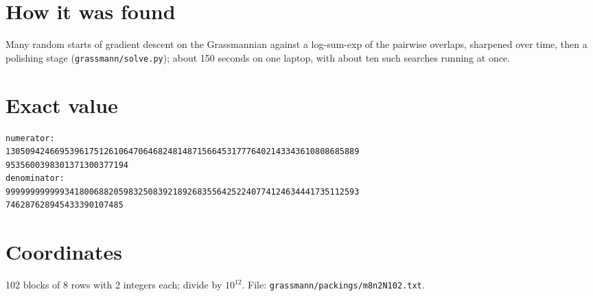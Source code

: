 \documentclass[11pt,a4paper]{article}
\begin{document}
\section{How it was found}
Many random starts of gradient descent on the Grassmannian against a log-sum-exp of the pairwise overlaps, sharpened over time, then a polishing stage (\texttt{grassmann/solve.py}); about 150 seconds on one laptop, with about ten such searches running at once.


\appendix
\section{Exact value}
{\small
\begin{verbatim}
numerator:
130509424669539617512610647064682481487156645317776402143343610808685889
9535600398301371300377194
denominator:
999999999999341800688205983250839218926835564252240774124634441735112593
746287628945433390107485
\end{verbatim}}

\section{Coordinates}
102 blocks of 8 rows with 2 integers each; divide by $10^{12}$. File: \texttt{grassmann/packings/m8n2N102.txt}.
{\tiny
\begin{multicols}{4}
\end{multicols}}
\end{document}
